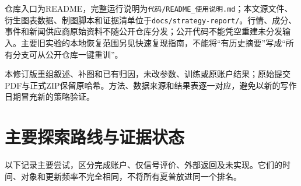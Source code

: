 \documentclass[11pt,a4paper]{article}
\begin{document}
仓库入口为README，完整运行说明为\texttt{代码/README\_使用说明.md}；本文源文件、衍生图表数据、制图脚本和证据清单位于\texttt{docs/strategy-report/}。行情、成分、事件和新闻供应商原始资料不随公开仓库分发；公开代码不能凭空重建未分发输入。主要旧实验的本地恢复范围另见快速复现指南，不能将“有历史摘要”写成“所有分支可从公开仓库一键重训”。

本修订版重组叙述、补图和已有归因，未改参数、训练或原账户结果；原始提交PDF与正式ZIP保留原哈希。方法、数据来源和结果表逐一对应，避免以新的写作日期冒充新的策略验证。

\clearpage
\appendix
\section{主要探索路线与证据状态}
以下记录主要尝试，区分完成账户、仅信号评价、外部返回及未实现。它们的时间、对象和更新频率不完全相同，不将所有夏普放进同一个排名。
\end{document}
